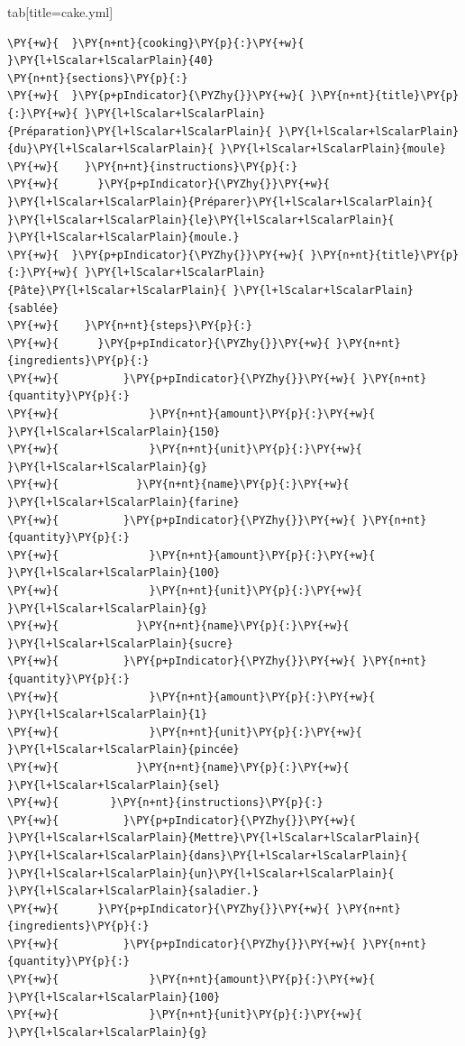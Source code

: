 \documentclass[a4paper,twoside]{article}
\begin{document}
\begin{tsdiv}{tab}[title=cake.yml]
\begin{tscode}[lang=yaml, engine=pygments]
\begin{Verbatim}[commandchars=\\\{\},breaklines, breakanywhere, commandchars=\\\{\}]
\PY{+w}{  }\PY{n+nt}{cooking}\PY{p}{:}\PY{+w}{ }\PY{l+lScalar+lScalarPlain}{40}
\PY{n+nt}{sections}\PY{p}{:}
\PY{+w}{  }\PY{p+pIndicator}{\PYZhy{}}\PY{+w}{ }\PY{n+nt}{title}\PY{p}{:}\PY{+w}{ }\PY{l+lScalar+lScalarPlain}{Préparation}\PY{l+lScalar+lScalarPlain}{ }\PY{l+lScalar+lScalarPlain}{du}\PY{l+lScalar+lScalarPlain}{ }\PY{l+lScalar+lScalarPlain}{moule}
\PY{+w}{    }\PY{n+nt}{instructions}\PY{p}{:}
\PY{+w}{      }\PY{p+pIndicator}{\PYZhy{}}\PY{+w}{ }\PY{l+lScalar+lScalarPlain}{Préparer}\PY{l+lScalar+lScalarPlain}{ }\PY{l+lScalar+lScalarPlain}{le}\PY{l+lScalar+lScalarPlain}{ }\PY{l+lScalar+lScalarPlain}{moule.}
\PY{+w}{  }\PY{p+pIndicator}{\PYZhy{}}\PY{+w}{ }\PY{n+nt}{title}\PY{p}{:}\PY{+w}{ }\PY{l+lScalar+lScalarPlain}{Pâte}\PY{l+lScalar+lScalarPlain}{ }\PY{l+lScalar+lScalarPlain}{sablée}
\PY{+w}{    }\PY{n+nt}{steps}\PY{p}{:}
\PY{+w}{      }\PY{p+pIndicator}{\PYZhy{}}\PY{+w}{ }\PY{n+nt}{ingredients}\PY{p}{:}
\PY{+w}{          }\PY{p+pIndicator}{\PYZhy{}}\PY{+w}{ }\PY{n+nt}{quantity}\PY{p}{:}
\PY{+w}{              }\PY{n+nt}{amount}\PY{p}{:}\PY{+w}{ }\PY{l+lScalar+lScalarPlain}{150}
\PY{+w}{              }\PY{n+nt}{unit}\PY{p}{:}\PY{+w}{ }\PY{l+lScalar+lScalarPlain}{g}
\PY{+w}{            }\PY{n+nt}{name}\PY{p}{:}\PY{+w}{ }\PY{l+lScalar+lScalarPlain}{farine}
\PY{+w}{          }\PY{p+pIndicator}{\PYZhy{}}\PY{+w}{ }\PY{n+nt}{quantity}\PY{p}{:}
\PY{+w}{              }\PY{n+nt}{amount}\PY{p}{:}\PY{+w}{ }\PY{l+lScalar+lScalarPlain}{100}
\PY{+w}{              }\PY{n+nt}{unit}\PY{p}{:}\PY{+w}{ }\PY{l+lScalar+lScalarPlain}{g}
\PY{+w}{            }\PY{n+nt}{name}\PY{p}{:}\PY{+w}{ }\PY{l+lScalar+lScalarPlain}{sucre}
\PY{+w}{          }\PY{p+pIndicator}{\PYZhy{}}\PY{+w}{ }\PY{n+nt}{quantity}\PY{p}{:}
\PY{+w}{              }\PY{n+nt}{amount}\PY{p}{:}\PY{+w}{ }\PY{l+lScalar+lScalarPlain}{1}
\PY{+w}{              }\PY{n+nt}{unit}\PY{p}{:}\PY{+w}{ }\PY{l+lScalar+lScalarPlain}{pincée}
\PY{+w}{            }\PY{n+nt}{name}\PY{p}{:}\PY{+w}{ }\PY{l+lScalar+lScalarPlain}{sel}
\PY{+w}{        }\PY{n+nt}{instructions}\PY{p}{:}
\PY{+w}{          }\PY{p+pIndicator}{\PYZhy{}}\PY{+w}{ }\PY{l+lScalar+lScalarPlain}{Mettre}\PY{l+lScalar+lScalarPlain}{ }\PY{l+lScalar+lScalarPlain}{dans}\PY{l+lScalar+lScalarPlain}{ }\PY{l+lScalar+lScalarPlain}{un}\PY{l+lScalar+lScalarPlain}{ }\PY{l+lScalar+lScalarPlain}{saladier.}
\PY{+w}{      }\PY{p+pIndicator}{\PYZhy{}}\PY{+w}{ }\PY{n+nt}{ingredients}\PY{p}{:}
\PY{+w}{          }\PY{p+pIndicator}{\PYZhy{}}\PY{+w}{ }\PY{n+nt}{quantity}\PY{p}{:}
\PY{+w}{              }\PY{n+nt}{amount}\PY{p}{:}\PY{+w}{ }\PY{l+lScalar+lScalarPlain}{100}
\PY{+w}{              }\PY{n+nt}{unit}\PY{p}{:}\PY{+w}{ }\PY{l+lScalar+lScalarPlain}{g}

\end{Verbatim}
\end{tscode}
\end{tsdiv}
\end{document}
